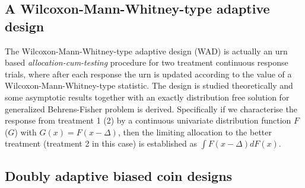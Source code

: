\subsection{A Wilcoxon-Mann-Whitney-type adaptive design}

The Wilcoxon-Mann-Whitney-type adaptive design\cite{33} (WAD) is actually an urn based \textit{allocation-cum-testing} procedure for
two treatment continuous response trials, where after each response the urn is updated according to the value of a Wilcoxon-Mann-Whitney-type
statistic. The design is studied theoretically and some asymptotic
results together with an exactly distribution free solution for
generalized Behrens-Fisher problem is derived. Specifically if we
characterise the response from treatment 1 (2) by a continuous univariate
distribution function $F$ ($G$) with $G(x)=F(x-\Delta)$, then the limiting allocation to the better treatment (treatment 2 in this case) is established as $\int F(x-\Delta)dF(x)$.

\subsection{Doubly adaptive biased coin designs}

